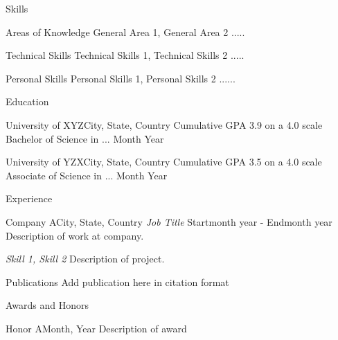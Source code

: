 \documentclass{./profile}
\begin{document}
	
	
	\begin{profsection}{Skills}
		\begin{profsubsection}{Areas of Knowledge}{}
			General Area 1, General Area 2 .....
		\end{profsubsection}
		
		\begin{profsubsection}{Technical Skills}{} 
			Technical Skills 1, Technical Skills 2 ..... 
		\end{profsubsection} 
		
		\begin{profsubsection}{Personal Skills}{}
			Personal Skills 1, Personal Skills 2 ......
		\end{profsubsection}
	\end{profsection}
	
	\begin{profsection}{Education}
		
		\begin{profsubsection} {University of XYZ}{City, State, Country}
			Cumulative GPA \hfill 3.9 on a 4.0 scale \newline
			Bachelor of Science in ... \hfill Month Year
		\end{profsubsection}
		
		\begin{profsubsection} {University of YZX}{City, State, Country}     
			Cumulative GPA \hfill 3.5 on a 4.0 scale \newline
			Associate of Science in ... \hfill Month Year
		\end{profsubsection}

	\end{profsection}
	
	\begin{profsection}{Experience}
		
		\begin{profsubsection}{Company A}{City, State, Country}
			\textit{Job Title} \normalsize \hfill Startmonth year - Endmonth year \newline
			Description of work at company.
			
			\textit{Skill 1, Skill 2} \newline
			Description of project.
			
		\end{profsubsection}
		
	\end{profsection}
	
	\begin{profsection}{Publications}
		Add publication here in citation format       
	\end{profsection}    
	
	\begin{profsection}{Awards and Honors}
		
		\begin{profsubsection}{Honor A}{Month, Year} 
			Description of award
		\end{profsubsection}
		
	\end{profsection}  
	
\end{document}
